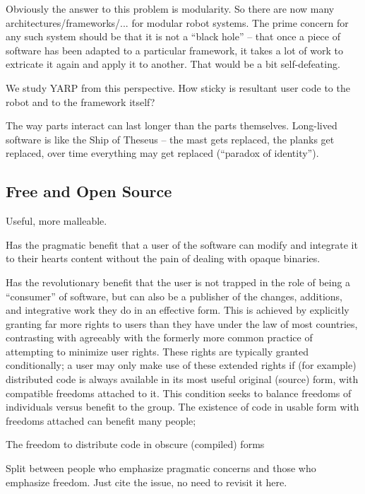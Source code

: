 Obviously the answer to this problem is modularity.  So there are 
now many architectures/frameworks/... for modular robot systems.
The prime concern for any such system should be that it is not
a ``black hole'' -- that once a piece of software has been adapted
to a particular framework, it takes a lot of work to extricate it
again and apply it to another.  That would be a bit self-defeating.

We study YARP from this perspective.  How sticky is resultant user
code to the robot and to the framework itself?


The way parts interact can last longer than the parts themselves.
Long-lived software is like the Ship of Theseus -- the mast gets replaced,
the planks get replaced, over time everything may get replaced (``paradox
of identity'').


\subsection{Free and Open Source}

Useful, more malleable.

Has the pragmatic benefit that a user of the software can
modify and integrate it to their hearts content without the 
pain of dealing with opaque binaries.

Has the revolutionary benefit that the user is not trapped in the role
of being a ``consumer'' of software, but can also be a publisher of
the changes, additions, and integrative work they do in an effective
form.  This is achieved by explicitly granting far more rights to
users than they have under the law of most countries, contrasting with
agreeably with the formerly more common practice of attempting to
minimize user rights.  These rights are typically granted
conditionally; a user may only make use of these extended rights if
(for example) distributed code is always available in its most useful
original (source) form, with compatible freedoms attached to it.  This
condition seeks to balance freedoms of individuals versus benefit to
the group.  The existence of code in usable form with freedoms 
attached can benefit many people;

The freedom to distribute code in obscure (compiled) forms



Split between people who emphasize pragmatic concerns and those
who emphasize freedom.  Just cite the issue, no need to revisit
it here.




